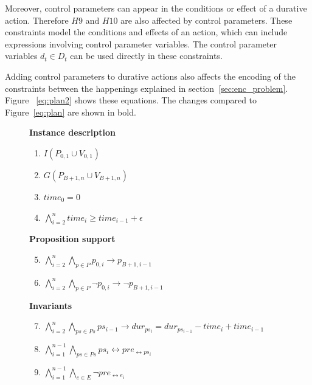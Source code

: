 Moreover, control parameters can appear in the conditions or effect of a durative action. Therefore $H9$ and $H10$ are also affected by control parameters. These constraints model the conditions and effects of an action, which can include expressions involving control parameter variables. The control parameter variables $d_t\in D_t$ can be used directly in these constraints.

Adding control parameters to durative actions also affects the encoding of the constraints between the happenings explained in section~\ref{sec:enc_problem}. Figure ~\ref{eq:plan2} shows these equations. The changes compared to Figure~\ref{eq:plan} are shown in bold.

\begin{figure}[thb!]
\begin{minipage}[t]{0.39\linewidth}
\textbf{Instance description}
\begin{enumerate}[label=P\arabic*.]
  \item $I(P_{0,1}\cup V_{0,1})$
  \item $G(P_{B+1,n}\cup V_{B+1,n})$
  \item $time_0 = 0$
  \item $\bigwedge_{i=2}^n time_i \geq time_{i-1}+\epsilon$
\end{enumerate}
\textbf{Proposition support}
\begin{enumerate}[label=P\arabic*.]\setcounter{enumi}{4}
  \item $\bigwedge_{i=2}^n \bigwedge_{p\in P} p_{0,i} \rightarrow p_{B+1,i-1}$
  \item $\bigwedge_{i=2}^n \bigwedge_{p\in P} \neg p_{0,i} \rightarrow \neg p_{B+1,i-1}$
\end{enumerate}
\end{minipage}
\begin{minipage}[t]{0.6\linewidth}
\textbf{Invariants}
\begin{enumerate}[label=P\arabic*.]\setcounter{enumi}{6}
  \item $\bigwedge_{i=2}^n \bigwedge_{ps\in Ps} ps_{i-1} \rightarrow dur_{ps_i} = dur_{ps_{i-1}} - time_i + time_{i-1}$
  \item $\bigwedge_{i=1}^{n-1} \bigwedge_{ps \in Ps}  ps_i \leftrightarrow pre_{\leftrightarrow ps_i}$
  \item $\bigwedge_{i=1}^{n-1} \bigwedge_{e\in E} \neg pre_{\leftrightarrow e_i}$

\end{enumerate}
\end{minipage}
\end{figure}
